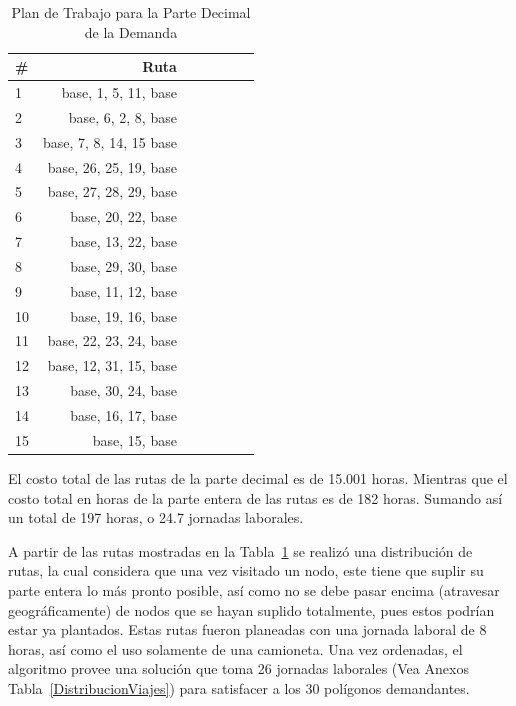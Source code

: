 \documentclass{amsart}
\begin{document}
    \begin{table}[!htp]\centering
    \caption{Plan de Trabajo para la Parte Decimal de la Demanda}\label{ParteDecimal}
    \begin{tabular}{lrrrrrr} \toprule
    \textbf{\#} & \textbf{Ruta} \\\midrule
    1 & base, 1, 5, 11, base \\
    2 & base, 6, 2, 8, base \\
    3 & base, 7, 8, 14, 15 base \\
    4 & base, 26, 25, 19, base \\
    5 & base, 27, 28, 29, base \\
    6 & base, 20, 22, base \\
    7 & base, 13, 22, base \\
    8 & base, 29, 30, base \\
    9 & base, 11, 12, base \\
    10 & base, 19, 16, base \\
    11 & base, 22, 23, 24, base \\
    12 & base, 12, 31, 15, base \\
    13 & base, 30, 24, base \\
    14 & base, 16, 17, base \\
    15 & base, 15, base \\
    \bottomrule
    \end{tabular}
    \end{table}

    El costo total de las rutas de la parte decimal es de 15.001 horas. Mientras que el costo total en horas de la parte entera de las rutas es de 182 horas. Sumando así un total de 197 horas, o 24.7 jornadas laborales.
            
    A partir de las rutas mostradas en la Tabla~\ref{ParteDecimal} se realizó una distribución de rutas, la cual considera que una vez visitado un nodo, este tiene que suplir su parte entera lo más pronto posible, así como no se debe pasar encima (atravesar geográficamente) de nodos que se hayan suplido totalmente, pues estos podrían estar ya plantados. Estas rutas fueron planeadas con una jornada laboral de 8 horas, así como el uso solamente de una camioneta. Una vez ordenadas, el algoritmo provee una solución que toma 26 jornadas laborales (Vea Anexos Tabla~\ref{DistribucionViajes}) para satisfacer a los 30 polígonos demandantes.




\newpage
\printbibliography[title={References}]
\end{document}
